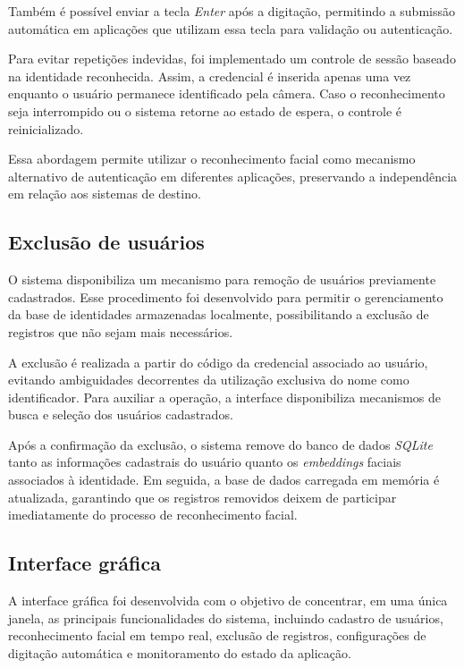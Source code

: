Também é possível enviar a tecla \textit{Enter} após a digitação, permitindo a submissão automática em aplicações que utilizam essa tecla para validação ou autenticação.

Para evitar repetições indevidas, foi implementado um controle de sessão baseado na identidade reconhecida. Assim, a credencial é inserida apenas uma vez enquanto o usuário permanece identificado pela câmera. Caso o reconhecimento seja interrompido ou o sistema retorne ao estado de espera, o controle é reinicializado.

Essa abordagem permite utilizar o reconhecimento facial como mecanismo alternativo de autenticação em diferentes aplicações, preservando a independência em relação aos sistemas de destino.


\subsection{Exclusão de usuários}

O sistema disponibiliza um mecanismo para remoção de usuários previamente cadastrados. Esse procedimento foi desenvolvido para permitir o gerenciamento da base de identidades armazenadas localmente, possibilitando a exclusão de registros que não sejam mais necessários.

A exclusão é realizada a partir do código da credencial associado ao usuário, evitando ambiguidades decorrentes da utilização exclusiva do nome como identificador. Para auxiliar a operação, a interface disponibiliza mecanismos de busca e seleção dos usuários cadastrados.

Após a confirmação da exclusão, o sistema remove do banco de dados \textit{SQLite} tanto as informações cadastrais do usuário quanto os \textit{embeddings} faciais associados à identidade. Em seguida, a base de dados carregada em memória é atualizada, garantindo que os registros removidos deixem de participar imediatamente do processo de reconhecimento facial.


\subsection{Interface gráfica}

A interface gráfica foi desenvolvida com o objetivo de concentrar, em uma única janela, as principais funcionalidades do sistema, incluindo cadastro de usuários, reconhecimento facial em tempo real, exclusão de registros, configurações de digitação automática e monitoramento do estado da aplicação.

